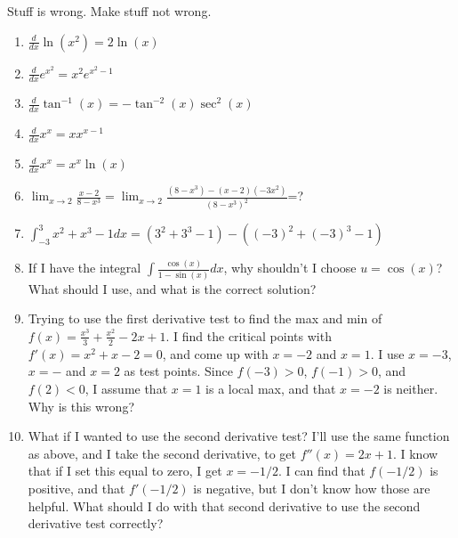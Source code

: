 \documentclass{exam}
\begin{document}
Stuff is wrong. Make stuff not wrong.
\begin{enumerate}
    \item $\frac{d}{dx} \ln(x^2) = 2\ln(x)$
    \item $\frac{d}{dx} e^{x^2} = x^2e^{x^2-1}$
    \item $\frac{d}{dx} \tan^{-1}(x) = -\tan^{-2}(x) \sec^2(x)$
    \item $\frac{d}{dx} x^x = xx^{x-1}$
    \item $\frac{d}{dx} x^x = x^x \ln(x)$
    \item $\lim_{x \rightarrow 2} \frac{x-2}{8 - x^3} = \lim_{x \rightarrow 2} \frac{(8-x^3) - (x-2)(-3x^2)}{(8-x^3)^2}$=?
    \item $\int_{-3}^3  x^2 + x^3 -1 dx = (3^2 + 3^3 -1) - ((-3)^2 + (-3)^3 -1)$
    \item If I have the integral $\int \frac{\cos(x)}{1 - \sin(x)} dx$, why shouldn't I choose $u = \cos(x)$? What should I use, and what is the correct solution?
    \item Trying to use the first derivative test to find the max and min of $f(x) = \frac{x^3}{3} + \frac{x^2}{2} -2x +1$. I find the critical points with $f'(x) = x^2 + x -2 = 0$, and come up with $x = -2$ and $x = 1$. I use $x = -3$, $x = -$ and $x = 2$ as test points. Since $f(-3)>0$, $f(-1)>0$, and $f(2) <0$, I assume that $x=1$ is a local max, and that $x = -2$ is neither. Why is this wrong?
    \item What if I wanted to use the second derivative test? I'll use the same function as above, and I take the second derivative, to get $f''(x) = 2x +1$. I know that if I set this equal to zero, I get $x = -1/2$. I can find that $f(-1/2)$ is positive, and that $f'(-1/2)$ is negative, but I don't know how those are helpful. What should I do with that second derivative to use the second derivative test correctly?

\end{enumerate}
\end{document}

